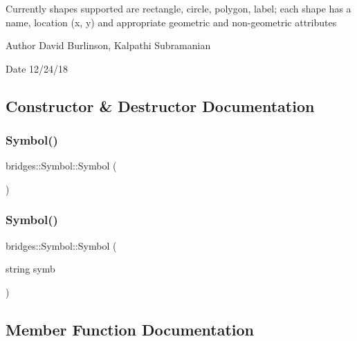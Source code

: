 Currently shapes supported are rectangle, circle, polygon, label; each shape has a name, location (x, y) and appropriate geometric and non-\/geometric attributes

\begin{DoxyAuthor}{Author}
David Burlinson, Kalpathi Subramanian 
\end{DoxyAuthor}
\begin{DoxyDate}{Date}
12/24/18 
\end{DoxyDate}


\subsection{Constructor \& Destructor Documentation}
\mbox{\label{classbridges_1_1_symbol_a4e1ce195ffc6c99e7f597ef63ed40aa6}} 
\subsubsection{\texorpdfstring{Symbol()}{Symbol()}\hspace{0.1cm}{\footnotesize\ttfamily [1/2]}}
{\footnotesize\ttfamily bridges\+::\+Symbol\+::\+Symbol (\begin{DoxyParamCaption}{ }\end{DoxyParamCaption})\hspace{0.3cm}{\ttfamily [inline]}}

\mbox{\label{classbridges_1_1_symbol_a047f3b1508fb62efdca8b688f462a866}} 
\subsubsection{\texorpdfstring{Symbol()}{Symbol()}\hspace{0.1cm}{\footnotesize\ttfamily [2/2]}}
{\footnotesize\ttfamily bridges\+::\+Symbol\+::\+Symbol (\begin{DoxyParamCaption}\item[{string}]{symb }\end{DoxyParamCaption})\hspace{0.3cm}{\ttfamily [inline]}}



\subsection{Member Function Documentation}
\mbox{\label{classbridges_1_1_symbol_a6eb190dc71b31b344b7610a07c6dc1d5}} 
